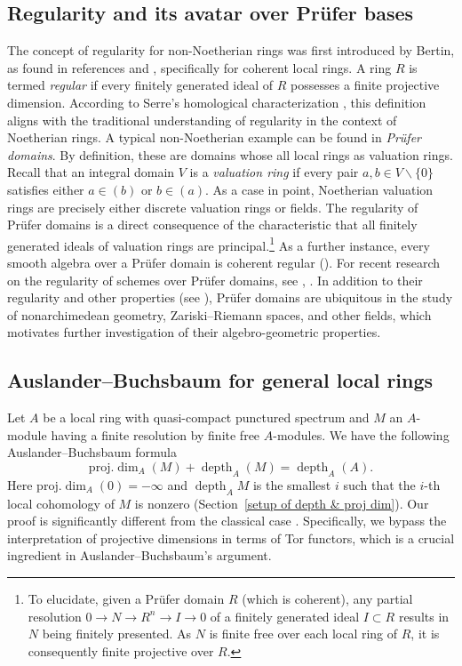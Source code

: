 \documentclass[JEP,XML,SOM,Unicode,published]{cedram}
\let\backslash\smallsetminus
\DeclareMathOperator{\depth}{depth}
\theoremstyle{plain}
\theoremstyle{definition}
\begin{document}
\subsection{Regularity and its avatar over Prüfer bases}\label{par-coh-reg}
The concept of regularity for non-Noetherian rings was first introduced by Bertin, as found in references \cite{Ber71} and \cite[Def.\,3.5]{Ber72}, specifically for coherent local rings. A ring
$R$ is termed \emph{regular} if every finitely generated ideal of $R$ possesses a finite projective dimension.
According to Serre's homological characterization \cite[Th.\,3]{Ser56}, this definition aligns with the traditional understanding of regularity in the context of Noetherian rings.
A typical non-Noetherian example can be found in \emph{Prüfer domains}. By definition, these are domains whose all local rings as valuation rings.
Recall that an integral domain $V$ is a \emph{valuation ring} if every pair $a,b\in V\backslash\{0\}$ satisfies either $a\in (b)$ or $b\in (a)$.
As a case in point, Noetherian valuation rings are precisely {either} discrete valuation rings {or fields}.
The regularity of Prüfer domains is a direct consequence of the characteristic that all finitely generated ideals of valuation rings are principal.\footnote{To elucidate, given a Prüfer domain
$R$ (which is coherent), any partial resolution
$0\to N \to R^n \to I \to 0$ of a finitely generated ideal $I\subset R$ results in $N$ being finitely presented. As $N$ is finite free over each local ring of $R$, it is consequently finite projective over
$R$.}
{As a further instance, every smooth algebra over a Prüfer domain is coherent regular ().}
For recent research on the regularity of schemes over Prüfer domains, see \cite{Kna03}, \cite{Kna08}.
In addition to their regularity and other properties (see \eg {}), Prüfer domains are ubiquitous in the study of nonarchimedean geometry, Zariski--Riemann spaces, and other fields, which motivates further investigation of their algebro-geometric properties.

\subsection{Auslander--Buchsbaum for general local rings}
Let $A$ be a local ring with quasi-compact punctured spectrum and $M$ an $A$\nobreakdash-mod\-ule having a finite resolution by finite free $A$\nobreakdash-mod\-ules.
We have the following Auslander--Buchsbaum formula
\[
\mathrm{proj.}\dim_A (M)+\depth_A(M)=\depth_A(A).
\]
Here $\mathrm{proj.}\dim_A(0)=-\infty$ and $\depth_AM$ is the smallest $i$ such that the $i$-th local cohomology of $M$ is nonzero (Section~\ref{setup of depth & proj dim}).
Our proof is significantly different from the classical case \cite[Th.\,3.7]{AB57}.
Specifically, we bypass the interpretation of projective dimensions in terms of Tor functors, which is a crucial ingredient in Auslander--Buchsbaum's argument.
\end{document}
